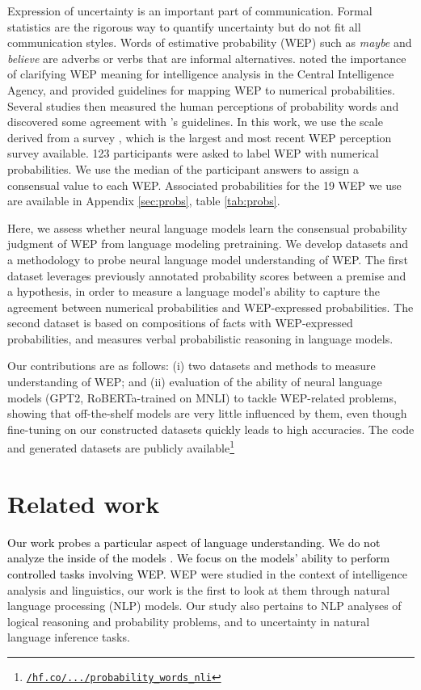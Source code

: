 \documentclass[11pt]{article}
\def \thecolor {black}
\newcommand{\blue}[1]{\textcolor{\thecolor}{#1}}
\begin{document}
Expression of uncertainty is an important part of communication.  Formal statistics are the rigorous way to quantify uncertainty but do not fit all communication styles. Words of estimative probability (WEP) such as \textit{maybe} and \textit{believe} are adverbs or verbs that are informal alternatives. \citet{kent1964words} noted the importance of clarifying WEP meaning for intelligence analysis in the Central Intelligence Agency, and provided guidelines for mapping WEP to numerical probabilities. Several studies then measured the human perceptions of probability words and discovered some agreement with \citet{kent1964words}'s guidelines. In this work, we use the scale derived from a survey \cite{fagen-ulmschneider}, which is the largest and most recent WEP perception survey available. 123 participants were asked to label WEP with numerical probabilities. We use the median of the participant answers to assign a consensual value to each WEP. Associated probabilities for the 19 WEP we use are available in Appendix \ref{sec:probs}, table \ref{tab:probs}.

Here, we assess whether neural language models learn the consensual probability judgment of WEP from language modeling pretraining. We develop datasets and a methodology to probe neural language model understanding of WEP. The first dataset leverages previously annotated probability scores between a premise and a hypothesis, in order to measure a language model's ability to capture the agreement between numerical probabilities and WEP-expressed probabilities. The second dataset is based on compositions of facts with WEP-expressed probabilities, and measures verbal probabilistic reasoning in language models.

Our contributions are as follows: (i) two datasets and methods to measure understanding of WEP; and  (ii) evaluation of the ability of neural language models (GPT2, RoBERTa-trained on MNLI) to tackle WEP-related problems, showing that off-the-shelf models are very little influenced by them, even though fine-tuning on our constructed datasets quickly leads to high accuracies. The code and generated datasets are publicly available\footnote{\href{https://huggingface.co/datasets/sileod/probability_words_nli}{\texttt{/hf.co/.../probability\_words\_nli}}}



\section{Related work}
\blue{Our work probes a particular aspect of language understanding. We do not analyze the inside of the models \citep{rogers-etal-2020-bertology}. We focus on the models' ability to perform controlled tasks \citep{naik-etal-2018-stress,richardson2020probing} involving WEP.} WEP were studied in the context of intelligence analysis and linguistics, our work is the first to look at them through natural language processing (NLP) models. Our study also pertains to NLP analyses of logical reasoning and probability problems, and to uncertainty in natural language inference tasks. 
\vspace{-0.1cm}
\end{document}
